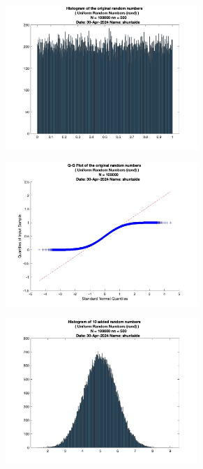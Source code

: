 \begin{figure}
	\centering
	\begin{subfigure}{0.48\linewidth}
		\centering
		\includegraphics[width=0.8\textwidth]{src/figures/cl-uniform/cl_original_rand_hist_N=100000_nn=500.jpg}
		\label{fig:cl-uniform-original}
	\end{subfigure}
	\begin{subfigure}{0.48\linewidth}
		\centering
		\includegraphics[width=0.8\textwidth]{src/figures/cl-uniform/cl_original_rand_qqpl_N=100000.jpg}
		\label{fig:cl-uniform-original-qqpl}
	\end{subfigure}
	\begin{subfigure}{0.48\linewidth}
		\centering
		\includegraphics[width=0.8\textwidth]{src/figures/cl-uniform/cl_added_rand_hist_N=100000_nn=500.jpg}

\end{subfigure}
\end{figure}
